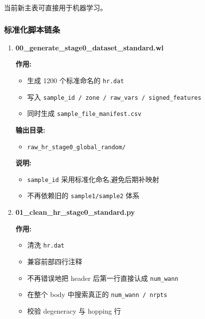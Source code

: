 \documentclass[lang=cn,scheme=chinese,color=blue,device=normal,toc=onecol,math=cm]{elegantbook}
\begin{document}
当前新主表可直接用于机器学习。\par


\subsubsection{标准化脚本链条}


\begin{enumerate}
\item \textbf{00\_\allowbreak{}generate\_\allowbreak{}stage0\_\allowbreak{}dataset\_\allowbreak{}standard.wl}\par
 
\textbf{作用:}\par
 
\begin{itemize}
\item 生成 1200 个标准命名的 \texttt{hr.dat}
\item 写入 \texttt{sample\_\allowbreak{}id /\allowbreak{} zone /\allowbreak{} raw\_\allowbreak{}vars /\allowbreak{} signed\_\allowbreak{}features}
\item 同时生成 \texttt{sample\_\allowbreak{}file\_\allowbreak{}manifest.csv}
\end{itemize}
 
\textbf{输出目录:}\par
 
\begin{itemize}
\item \texttt{raw\_\allowbreak{}hr\_\allowbreak{}stage0\_\allowbreak{}global\_\allowbreak{}random/\allowbreak{}}
\end{itemize}
 
\textbf{说明:}\par
 
\begin{itemize}
\item \texttt{sample\_\allowbreak{}id} 采用标准化命名,避免后期补映射
\item 不再依赖旧的 \texttt{sample1/\allowbreak{}sample2} 体系
\end{itemize}
\item \textbf{01\_\allowbreak{}clean\_\allowbreak{}hr\_\allowbreak{}stage0\_\allowbreak{}standard.py}\par
 
\textbf{作用:}\par
 
\begin{itemize}
\item 清洗 \texttt{hr.dat}
\item 兼容前部四行注释
\item 不再错误地把 header 后第一行直接认成 \texttt{num\_\allowbreak{}wann}
\item 在整个 body 中搜索真正的 \texttt{num\_\allowbreak{}wann /\allowbreak{} nrpts}
\item 校验 degeneracy 与 hopping 行
\end{itemize}
 

\end{enumerate}
\end{document}
